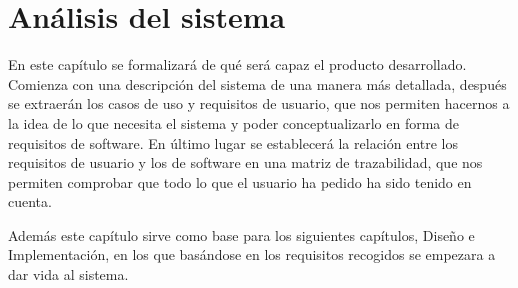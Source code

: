 \chapter{Análisis del sistema}
\label{ch:analisis}
En este capítulo se formalizará de qué será capaz el producto desarrollado. Comienza con una descripción del sistema de una manera más detallada, después se extraerán los casos de uso y requisitos de usuario, que nos permiten hacernos a la idea de lo que necesita el sistema y poder conceptualizarlo en forma de requisitos de software. En último lugar se establecerá la relación entre los requisitos de usuario y los de software en una matriz de trazabilidad, que nos permiten comprobar que todo lo que el usuario ha pedido ha sido tenido en cuenta.

Además este capítulo sirve como base para los siguientes capítulos, Diseño e Implementación, en los que basándose en los requisitos recogidos se empezara a dar vida al sistema.

